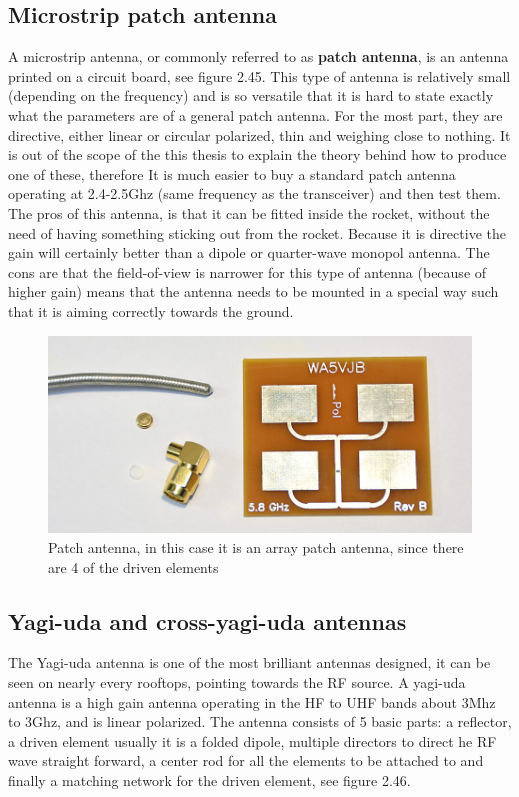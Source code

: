 \newpage

\subsection{Microstrip patch antenna}
A microstrip antenna, or commonly referred to as \textbf{patch antenna}, is an antenna printed on a circuit board, see figure 2.45. This type of antenna is relatively small (depending on the frequency) and is so versatile that it is hard to state exactly what the parameters are of a general patch antenna. For the most part, they are directive, either linear or circular polarized, thin and weighing close to nothing. It is out of the scope of the this thesis to explain the theory behind how to produce one of these, therefore It is much easier to buy a standard patch antenna operating at 2.4-2.5Ghz (same frequency as the transceiver) and then test them. The pros of this antenna, is that it can be fitted inside the rocket, without the need of having something sticking out from the rocket. Because it is directive the gain will certainly better than a dipole or quarter-wave monopol antenna. The cons are that the field-of-view is narrower for this type of antenna (because of higher gain) means that the antenna needs to be mounted in a special way such that it is aiming correctly towards the ground.  

\begin{figure}[h]
\centering
\includegraphics[scale=0.5]{figures/PatchAntenna.jpg}
\caption{Patch antenna, in this case it is an array patch antenna, since there are 4 of the driven elements\cite{PatchAntenna}}
\end{figure}

\subsection{Yagi-uda and cross-yagi-uda antennas}
The Yagi-uda antenna is one of the most brilliant antennas designed, it can be seen on nearly every rooftops, pointing towards the RF source. A yagi-uda antenna is a high gain antenna operating in the HF to UHF bands about 3Mhz to 3Ghz, and is linear polarized. The antenna consists of 5 basic parts: a reflector, a driven element usually it is a folded dipole, multiple directors to direct he RF wave straight forward, a center rod for all the elements to be attached to and finally a matching network for the driven element, see figure 2.46.

